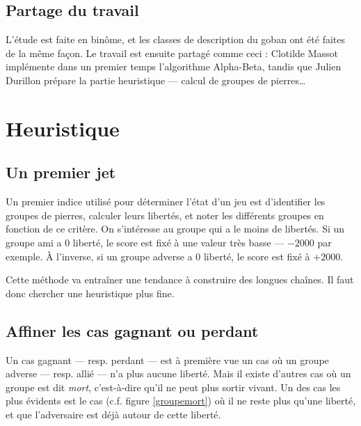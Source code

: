 \documentclass[11pt,a4paper,titlepage,french]{article}
\begin{document}
		\subsection{Partage du travail}
			L'étude est faite en binôme, et les classes de description du goban ont été faites de la même façon. Le travail est ensuite partagé comme ceci : Clotilde Massot implémente dans un premier temps l'algorithme Alpha-Beta, tandis que Julien Durillon prépare la partie heuristique --- calcul de groupes de pierres\dots %


	\section{Heuristique}

		\subsection{Un premier jet}
			Un premier indice utilisé pour déterminer l'état d'un jeu est d'identifier les groupes de pierres, calculer leurs libertés, et noter les différents groupes en fonction de ce critère. On s'intéresse au groupe qui a le moins de libertés. Si un groupe ami a 0 liberté, le score est fixé à une valeur très basse --- $-2000$ par exemple. À l'inverse, si un groupe adverse a 0 liberté, le score est fixé à $+2000$.

			Cette méthode va entraîner une tendance à construire des longues chaînes. Il faut donc chercher une heuristique plus fine.

		\subsection{Affiner les cas gagnant ou perdant}
			Un cas gagnant --- resp. perdant --- est à première vue un cas où un groupe adverse --- resp. allié --- n'a plus aucune liberté. Mais il existe d'autres cas où un groupe est dit \emph{mort}, c'est-à-dire qu'il ne peut plus sortir vivant. Un des cas les plus évidents est le cas (c.f. figure \ref{groupemort}) où il ne reste plus qu'une liberté, et que l'adversaire est déjà autour de cette liberté.
\end{document}
